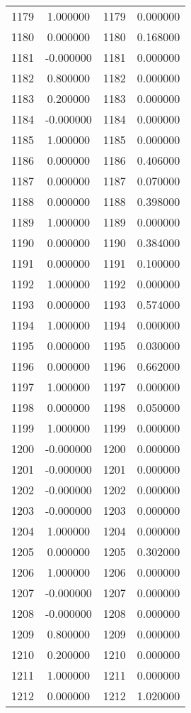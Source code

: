 \documentclass[12pt]{article}
\begin{document}
\begin{longtable}{@{}cccc@{}}
1179 & 1.000000 & 1179 & 0.000000 \\
1180 & 0.000000 & 1180 & 0.168000 \\
1181 & -0.000000 & 1181 & 0.000000 \\
1182 & 0.800000 & 1182 & 0.000000 \\
1183 & 0.200000 & 1183 & 0.000000 \\
1184 & -0.000000 & 1184 & 0.000000 \\
1185 & 1.000000 & 1185 & 0.000000 \\
1186 & 0.000000 & 1186 & 0.406000 \\
1187 & 0.000000 & 1187 & 0.070000 \\
1188 & 0.000000 & 1188 & 0.398000 \\
1189 & 1.000000 & 1189 & 0.000000 \\
1190 & 0.000000 & 1190 & 0.384000 \\
1191 & 0.000000 & 1191 & 0.100000 \\
1192 & 1.000000 & 1192 & 0.000000 \\
1193 & 0.000000 & 1193 & 0.574000 \\
1194 & 1.000000 & 1194 & 0.000000 \\
1195 & 0.000000 & 1195 & 0.030000 \\
1196 & 0.000000 & 1196 & 0.662000 \\
1197 & 1.000000 & 1197 & 0.000000 \\
1198 & 0.000000 & 1198 & 0.050000 \\
1199 & 1.000000 & 1199 & 0.000000 \\
1200 & -0.000000 & 1200 & 0.000000 \\
1201 & -0.000000 & 1201 & 0.000000 \\
1202 & -0.000000 & 1202 & 0.000000 \\
1203 & -0.000000 & 1203 & 0.000000 \\
1204 & 1.000000 & 1204 & 0.000000 \\
1205 & 0.000000 & 1205 & 0.302000 \\
1206 & 1.000000 & 1206 & 0.000000 \\
1207 & -0.000000 & 1207 & 0.000000 \\
1208 & -0.000000 & 1208 & 0.000000 \\
1209 & 0.800000 & 1209 & 0.000000 \\
1210 & 0.200000 & 1210 & 0.000000 \\
1211 & 1.000000 & 1211 & 0.000000 \\
1212 & 0.000000 & 1212 & 1.020000 \\

\end{longtable}
\end{document}
